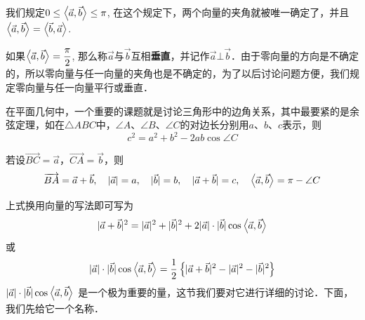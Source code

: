 我们规定$0\le \left\langle \vec{a},\vec{b} \right\rangle\le \pi$, 在这个规定下，两个向量的夹角就被唯一确定了，并且$\left\langle \vec{a},\vec{b} \right\rangle=\left\langle \vec{b},\vec{a} \right\rangle$.

\begin{figure}[htp]
    \centering
    \begin{minipage}[t]{0.48\textwidth}
    \centering
    \caption{}
    \end{minipage}
    \begin{minipage}[t]{0.48\textwidth}
    \centering
    \caption{}
    \end{minipage}
  \end{figure}

如果$\left\langle \vec{a},\vec{b} \right\rangle=\dfrac{\pi}{2}$, 那么称$\vec{a}$与$\vec{b}$互相\textbf{垂直}，并记作$\vec{a}\bot \vec{b}$．由于零向量的方向是不确定的，所以零向量与任一向量的夹角也是不确定的，为了以后讨论问题方便，我们规定零向量与任一向量平行或垂直．

在平面几何中，一个重要的课题就是讨论三角形中的边角关系，其中最要紧的是余弦定理，如在$\triangle ABC$中，$\angle A$、$\angle B$、$\angle C$的对边长分别用$a$、$b$、$c$表示，则
\[c^2=a^2+b^2-2ab\cos\angle C\]

若设$\Vec{BC}=\vec{a}$，$\Vec{CA}=\vec{b}$，则
\[\overrightarrow{BA}=\vec{a}+\vec{b},\quad |\vec{a}|=a,\quad |\vec{b}|=b,\quad |\vec{a}+\vec{b}|=c,\quad \left\langle \vec{a},\vec{b} \right\rangle=\pi-\angle C\]

上式换用向量的写法即可写为
\[|\vec{a}+\vec{b}|^2=|\vec{a}|^2+|\vec{b}|^2+2|\vec{a}|\cdot |\vec{b}|\cos\left\langle \vec{a},\vec{b} \right\rangle\]
或
\[|\vec{a}|\cdot |\vec{b}|\cos\left\langle \vec{a},\vec{b} \right\rangle=\dfrac{1}{2}\left\{|\vec{a}+\vec{b}|^2-|\vec{a}|^2-|\vec{b}|^2\right\}\]
$|\vec{a}|\cdot |\vec{b}|\cos\left\langle \vec{a},\vec{b} \right\rangle$
是一个极为重要的量，这节我们要对它进行详细的讨论．下面，我们先给它一个名称．

